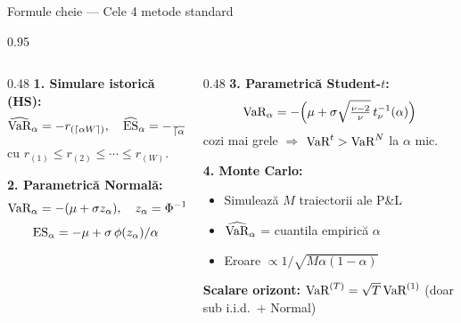\documentclass[9pt, aspectratio=169, t]{beamer}
\begin{document}
\begin{frame}[shrink=10]{Formule cheie --- Cele 4 metode standard}
    \begin{cminipage}{0.95\textwidth}
    \begin{columns}[T]
        \begin{column}{0.48\textwidth}
            \textbf{1. Simulare istorică (HS):}
            \[
            \widehat{\text{VaR}}_\alpha = -r_{(\lceil \alpha W\rceil)}, \quad
            \widehat{\text{ES}}_\alpha = -\tfrac{1}{\lceil \alpha W\rceil}\textstyle\sum_{i=1}^{\lceil \alpha W\rceil} r_{(i)}
            \]
            cu $r_{(1)} \leq r_{(2)} \leq \cdots \leq r_{(W)}$.

            \vspace{0.15cm}
            \textbf{2. Parametrică Normală:}
            \[
            \text{VaR}_\alpha = -(\mu + \sigma z_\alpha), \quad z_\alpha = \Phi^{-1}(\alpha)
            \]
            \[
            \text{ES}_\alpha = -\mu + \sigma\, \phi(z_\alpha)/\alpha
            \]
        \end{column}
        \begin{column}{0.48\textwidth}
            \textbf{3. Parametrică Student-$t$:}
            \[
            \text{VaR}_\alpha = -\Big(\mu + \sigma\sqrt{\tfrac{\nu-2}{\nu}}\, t_\nu^{-1}(\alpha)\Big)
            \]
            cozi mai grele $\Rightarrow$ $\text{VaR}^{t} > \text{VaR}^{N}$ la $\alpha$ mic.

            \vspace{0.15cm}
            \textbf{4. Monte Carlo:}
            \begin{itemize}\setlength{\itemsep}{0pt}
                \item Simulează $M$ traiectorii ale P\&L
                \item $\widehat{\text{VaR}}_\alpha$ = cuantila empirică $\alpha$
                \item Eroare $\propto 1/\sqrt{M\alpha(1-\alpha)}$
            \end{itemize}

            \vspace{0.15cm}
            \textbf{Scalare orizont:} $\text{VaR}^{(T)} = \sqrt{T}\,\text{VaR}^{(1)}$ (doar sub i.i.d.\ + Normal)
        \end{column}
    \end{columns}
    \end{cminipage}
\end{frame}
\end{document}
